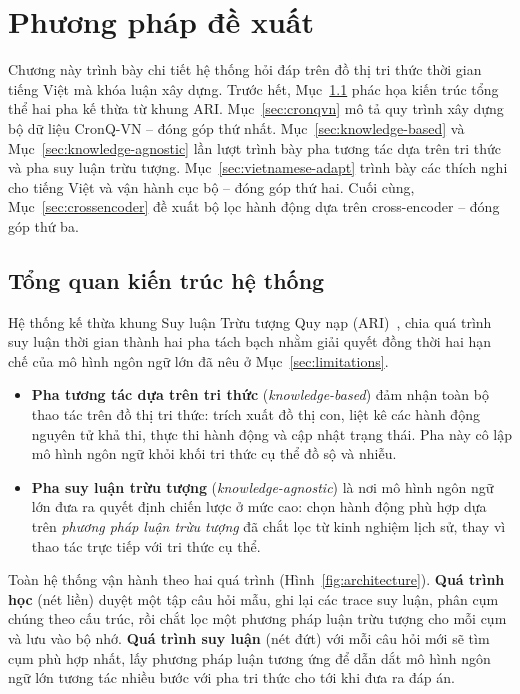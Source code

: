 \chapter{Phương pháp đề xuất}
\label{ch:method}

Chương này trình bày chi tiết hệ thống hỏi đáp trên đồ thị tri thức thời gian tiếng Việt mà khóa
luận xây dựng. Trước hết, Mục~\ref{sec:overview} phác họa kiến trúc tổng thể hai pha kế thừa từ
khung ARI. Mục~\ref{sec:cronqvn} mô tả quy trình xây dựng bộ dữ liệu CronQ-VN -- đóng góp thứ nhất.
Mục~\ref{sec:knowledge-based} và Mục~\ref{sec:knowledge-agnostic} lần lượt trình bày pha tương tác
dựa trên tri thức và pha suy luận trừu tượng. Mục~\ref{sec:vietnamese-adapt} trình bày các thích
nghi cho tiếng Việt và vận hành cục bộ -- đóng góp thứ hai. Cuối cùng, Mục~\ref{sec:crossencoder}
đề xuất bộ lọc hành động dựa trên cross-encoder -- đóng góp thứ ba.

\section{Tổng quan kiến trúc hệ thống}
\label{sec:overview}

Hệ thống kế thừa khung Suy luận Trừu tượng Quy nạp (ARI)~\cite{chen2024ari}, chia quá trình suy
luận thời gian thành hai pha tách bạch nhằm giải quyết đồng thời hai hạn chế của mô hình ngôn ngữ
lớn đã nêu ở Mục~\ref{sec:limitations}.

\begin{itemize}
  \item \textbf{Pha tương tác dựa trên tri thức} (\textit{knowledge-based}) đảm nhận toàn bộ thao
  tác trên đồ thị tri thức: trích xuất đồ thị con, liệt kê các hành động nguyên tử khả thi, thực
  thi hành động và cập nhật trạng thái. Pha này cô lập mô hình ngôn ngữ khỏi khối tri thức cụ thể
  đồ sộ và nhiễu.
  \item \textbf{Pha suy luận trừu tượng} (\textit{knowledge-agnostic}) là nơi mô hình ngôn ngữ lớn
  đưa ra quyết định chiến lược ở mức cao: chọn hành động phù hợp dựa trên \emph{phương pháp luận
  trừu tượng} đã chắt lọc từ kinh nghiệm lịch sử, thay vì thao tác trực tiếp với tri thức cụ thể.
\end{itemize}

Toàn hệ thống vận hành theo hai quá trình (Hình~\ref{fig:architecture}). \textbf{Quá trình học}
(nét liền) duyệt một tập câu hỏi mẫu, ghi lại các trace suy luận, phân cụm chúng theo cấu trúc, rồi
chắt lọc một phương pháp luận trừu tượng cho mỗi cụm và lưu vào bộ nhớ. \textbf{Quá trình suy luận}
(nét đứt) với mỗi câu hỏi mới sẽ tìm cụm phù hợp nhất, lấy phương pháp luận tương ứng để dẫn dắt mô
hình ngôn ngữ lớn tương tác nhiều bước với pha tri thức cho tới khi đưa ra đáp án.

